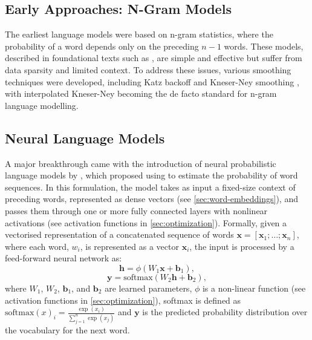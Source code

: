 \subsection{Early Approaches: N-Gram Models}
The earliest language models were based on n-gram statistics, where the probability of a word depends only on the preceding $n-1$ words. These models, described in foundational texts such as \cite{jurafsky2025speech}, are simple and effective but suffer from data sparsity and limited context. To address these issues, various smoothing techniques were developed, including Katz backoff \citep{katz2003estimation} and Kneser-Ney smoothing \citep{kneser1995improved}, with interpolated Kneser-Ney \citep{chen1999empirical} becoming the de facto standard for n-gram language modelling.

\subsection{Neural Language Models}
\label{sec:neural-language-models}

A major breakthrough came with the introduction of neural probabilistic language models by \cite{bengio2003neural}, which proposed using  to estimate the probability of word sequences. In this formulation, the model takes as input a fixed-size context of preceding words, represented as dense vectors (see \cref{sec:word-embeddings}), and passes them through one or more fully connected layers with nonlinear activations (see activation functions in \cref{sec:optimization}). Formally, given a vectorised representation of a concatenated sequence of words $\mathbf{x} = [\mathbf{x}_1; \dots; \mathbf{x}_n]$, where each word, $w_i$, is represented as a vector $\mathbf{x}_i$, the input is processed by a feed-forward neural network as:
\begin{equation}
\mathbf{h} = \phi(W_1 \mathbf{x} + \mathbf{b}_1),
\end{equation}
\begin{equation}
\mathbf{y} = \text{softmax}(W_2 \mathbf{h} + \mathbf{b}_2),
\end{equation}
where $W_1$, $W_2$, $\mathbf{b}_1$, and $\mathbf{b}_2$ are learned parameters, $\phi$ is a non-linear function (see activation functions in \cref{sec:optimization}), softmax is defined as $\text{softmax}(x)_i = \frac{\exp(x_i)}{\sum_{j=1}^n \exp(x_j)}$ and $\mathbf{y}$ is the predicted probability distribution over the vocabulary for the next word. 

